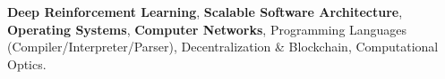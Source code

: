 \textbf{Deep Reinforcement Learning}, \textbf{Scalable Software Architecture}, \textbf{Operating Systems}, \textbf{Computer Networks}, Programming Languages (Compiler/Interpreter/Parser), Decentralization \& Blockchain, Computational Optics.